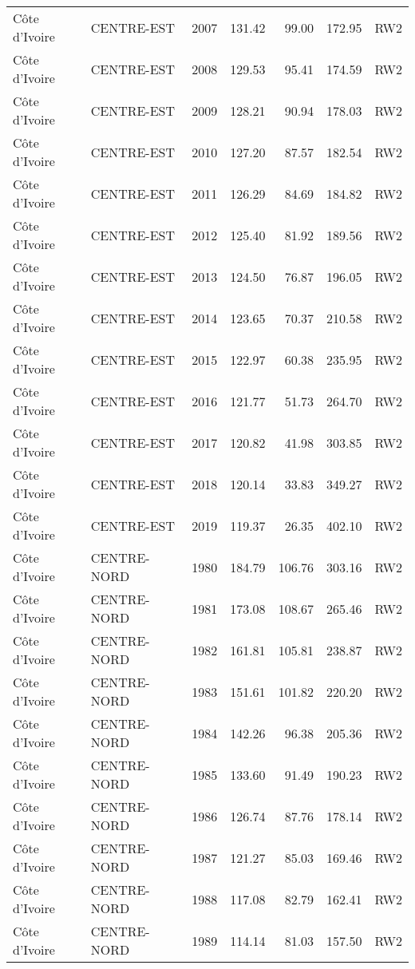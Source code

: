 \begin{longtable}{lllrrrl}
  C\^{o}te d'Ivoire & CENTRE-EST & 2007 & 131.42 & 99.00 & 172.95 & RW2 \\ 
  C\^{o}te d'Ivoire & CENTRE-EST & 2008 & 129.53 & 95.41 & 174.59 & RW2 \\ 
  C\^{o}te d'Ivoire & CENTRE-EST & 2009 & 128.21 & 90.94 & 178.03 & RW2 \\ 
  C\^{o}te d'Ivoire & CENTRE-EST & 2010 & 127.20 & 87.57 & 182.54 & RW2 \\ 
  C\^{o}te d'Ivoire & CENTRE-EST & 2011 & 126.29 & 84.69 & 184.82 & RW2 \\ 
  C\^{o}te d'Ivoire & CENTRE-EST & 2012 & 125.40 & 81.92 & 189.56 & RW2 \\ 
  C\^{o}te d'Ivoire & CENTRE-EST & 2013 & 124.50 & 76.87 & 196.05 & RW2 \\ 
  C\^{o}te d'Ivoire & CENTRE-EST & 2014 & 123.65 & 70.37 & 210.58 & RW2 \\ 
  C\^{o}te d'Ivoire & CENTRE-EST & 2015 & 122.97 & 60.38 & 235.95 & RW2 \\ 
  C\^{o}te d'Ivoire & CENTRE-EST & 2016 & 121.77 & 51.73 & 264.70 & RW2 \\ 
  C\^{o}te d'Ivoire & CENTRE-EST & 2017 & 120.82 & 41.98 & 303.85 & RW2 \\ 
  C\^{o}te d'Ivoire & CENTRE-EST & 2018 & 120.14 & 33.83 & 349.27 & RW2 \\ 
  C\^{o}te d'Ivoire & CENTRE-EST & 2019 & 119.37 & 26.35 & 402.10 & RW2 \\ 
  C\^{o}te d'Ivoire & CENTRE-NORD & 1980 & 184.79 & 106.76 & 303.16 & RW2 \\ 
  C\^{o}te d'Ivoire & CENTRE-NORD & 1981 & 173.08 & 108.67 & 265.46 & RW2 \\ 
  C\^{o}te d'Ivoire & CENTRE-NORD & 1982 & 161.81 & 105.81 & 238.87 & RW2 \\ 
  C\^{o}te d'Ivoire & CENTRE-NORD & 1983 & 151.61 & 101.82 & 220.20 & RW2 \\ 
  C\^{o}te d'Ivoire & CENTRE-NORD & 1984 & 142.26 & 96.38 & 205.36 & RW2 \\ 
  C\^{o}te d'Ivoire & CENTRE-NORD & 1985 & 133.60 & 91.49 & 190.23 & RW2 \\ 
  C\^{o}te d'Ivoire & CENTRE-NORD & 1986 & 126.74 & 87.76 & 178.14 & RW2 \\ 
  C\^{o}te d'Ivoire & CENTRE-NORD & 1987 & 121.27 & 85.03 & 169.46 & RW2 \\ 
  C\^{o}te d'Ivoire & CENTRE-NORD & 1988 & 117.08 & 82.79 & 162.41 & RW2 \\ 
  C\^{o}te d'Ivoire & CENTRE-NORD & 1989 & 114.14 & 81.03 & 157.50 & RW2 \\ 

\end{longtable}
